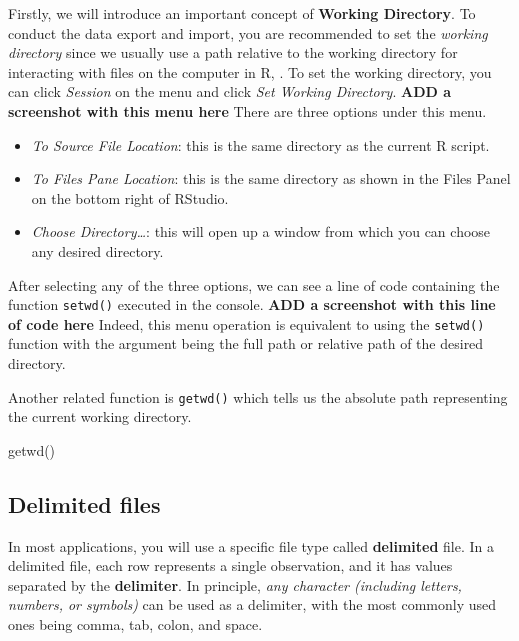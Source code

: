 \documentclass[
]{book}
\newenvironment{Shaded}{\begin{snugshade}}{\end{snugshade}}
\newcommand{\FunctionTok}[1]{\textcolor[rgb]{0.00,0.00,0.00}{#1}}
\newcommand{\NormalTok}[1]{#1}
\providecommand{\tightlist}{%
  \setlength{\itemsep}{0pt}\setlength{\parskip}{0pt}}
\begin{document}
Firstly, we will introduce an important concept of \textbf{Working Directory}. To conduct the data export and import, you are recommended to set the \emph{working directory} since we usually use a path relative to the working directory for interacting with files on the computer in R, . To set the working directory, you can click \emph{Session} on the menu and click \emph{Set Working Directory}. \textbf{ADD a screenshot with this menu here} There are three options under this menu.

\begin{itemize}
\tightlist
\item
  \emph{To Source File Location}: this is the same directory as the current R script.
\item
  \emph{To Files Pane Location}: this is the same directory as shown in the Files Panel on the bottom right of RStudio.
\item
  \emph{Choose Directory\ldots{}}: this will open up a window from which you can choose any desired directory.
\end{itemize}

After selecting any of the three options, we can see a line of code containing the function \texttt{setwd()} executed in the console. \textbf{ADD a screenshot with this line of code here} Indeed, this menu operation is equivalent to using the \texttt{setwd()} function with the argument being the full path or relative path of the desired directory.

Another related function is \texttt{getwd()} which tells us the absolute path representing the current working directory.

\begin{Shaded}
\begin{Highlighting}[]
\FunctionTok{getwd}\NormalTok{()}
\end{Highlighting}
\end{Shaded}

\hypertarget{delimited-files}{%
\subsection{Delimited files}\label{delimited-files}}

In most applications, you will use a specific file type called \textbf{delimited} file. In a delimited file, each row represents a single observation, and it has values separated by the \textbf{delimiter}. In principle, \emph{any character (including letters, numbers, or symbols)} can be used as a delimiter, with the most commonly used ones being comma, tab, colon, and space.
\end{document}
